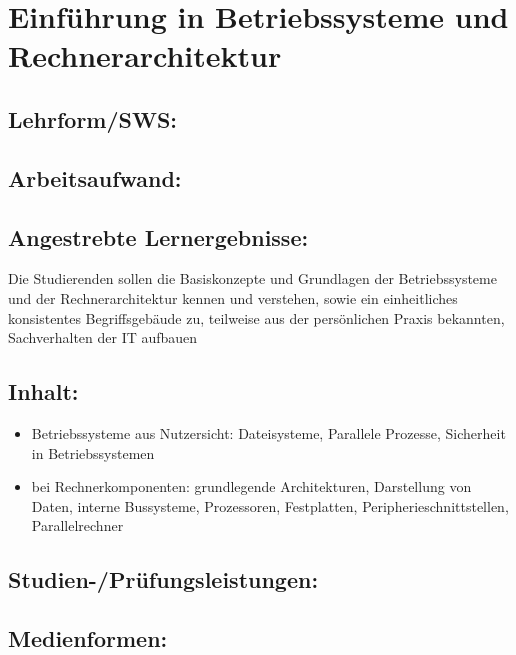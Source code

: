 \chapter{Einführung in Betriebssysteme und
Rechnerarchitektur}\label{einfuxfchrung-in-betriebssysteme-und-rechnerarchitektur}

\section{Lehrform/SWS:}\label{lehrformsws-8}

\section{Arbeitsaufwand:}\label{arbeitsaufwand-8}

\section{Angestrebte
Lernergebnisse:}\label{angestrebte-lernergebnisse-8}

Die Studierenden sollen die Basiskonzepte und Grundlagen der
Betriebssysteme und der Rechnerarchitektur kennen und verstehen, sowie
ein einheitliches konsistentes Begriffsgebäude zu, teilweise aus der
persönlichen Praxis bekannten, Sachverhalten der IT aufbauen

\section{Inhalt:}\label{inhalt-8}

\begin{itemize}
\tightlist
\item
  Betriebssysteme aus Nutzersicht: Dateisysteme, Parallele Prozesse,
  Sicherheit in Betriebssystemen
\item
  bei Rechnerkomponenten: grundlegende Architekturen, Darstellung von
  Daten, interne Bussysteme, Prozessoren, Festplatten,
  Peripherieschnittstellen, Parallelrechner
\end{itemize}

\section{Studien-/Prüfungsleistungen:}\label{studien-pruxfcfungsleistungen-8}

\section{Medienformen:}\label{medienformen-8}

